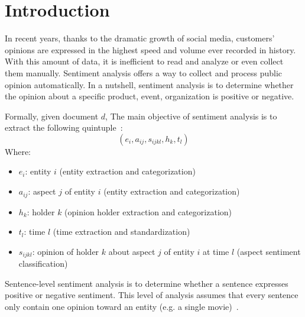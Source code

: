 \section{Introduction}
In recent years, thanks to the dramatic growth of social media, customers' opinions are expressed in the highest speed and volume ever recorded in history.
With this amount of data, it is inefficient to read and analyze or even collect them manually. 
Sentiment analysis offers a way to collect and process public opinion automatically.
In a nutshell, sentiment analysis is to determine whether the opinion about a specific product, event, organization is positive or negative. 

Formally, given document $d$, The main objective of sentiment analysis is to extract the following quintuple~\cite{liu2012sentiment}:
\[ ( e_{i}, a_{ij}, s_{ijkl}, h_{k}, t_{l} ) \]
Where:
\begin{itemize}
	\item $e_{i}$: entity \(i\) (entity extraction and categorization)
	\item $a_{ij}$: aspect \(j\) of entity \(i\) (entity extraction and categorization)
	\item $h_{k}$: holder \(k\) (opinion holder extraction and categorization)
	\item $t_{l}$: time \(l\) (time extraction and standardization)
	\item $s_{ijkl}$: opinion of holder \(k\) about aspect \(j\) of entity \(i\) at time \(l\) (aspect sentiment classification)
\end{itemize}
Sentence-level sentiment analysis is to determine whether a sentence expresses positive or negative sentiment. 
This level of analysis assumes that every sentence only contain one opinion toward an entity (e.g. a single movie)~\cite{liu2012sentiment}.

